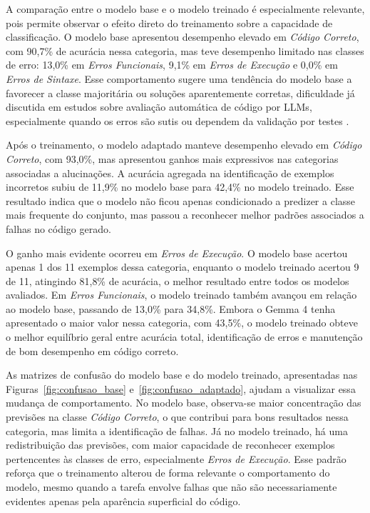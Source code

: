\documentclass[conference]{IEEEtran}
\begin{document}
A comparação entre o modelo base e o modelo treinado é especialmente relevante, pois permite observar o efeito direto do treinamento sobre a capacidade de classificação. O modelo base apresentou desempenho elevado em \emph{Código Correto}, com 90{,}7\% de acurácia nessa categoria, mas teve desempenho limitado nas classes de erro: 13{,}0\% em \emph{Erros Funcionais}, 9{,}1\% em \emph{Erros de Execução} e 0{,}0\% em \emph{Erros de Sintaxe}. Esse comportamento sugere uma tendência do modelo base a favorecer a classe majoritária ou soluções aparentemente corretas, dificuldade já discutida em estudos sobre avaliação automática de código por LLMs, especialmente quando os erros são sutis ou dependem da validação por testes \cite{2507.16587}.

Após o treinamento, o modelo adaptado manteve desempenho elevado em \emph{Código Correto}, com 93{,}0\%, mas apresentou ganhos mais expressivos nas categorias associadas a alucinações. A acurácia agregada na identificação de exemplos incorretos subiu de 11{,}9\% no modelo base para 42{,}4\% no modelo treinado. Esse resultado indica que o modelo não ficou apenas condicionado a predizer a classe mais frequente do conjunto, mas passou a reconhecer melhor padrões associados a falhas no código gerado.

O ganho mais evidente ocorreu em \emph{Erros de Execução}. O modelo base acertou apenas 1 dos 11 exemplos dessa categoria, enquanto o modelo treinado acertou 9 de 11, atingindo 81{,}8\% de acurácia, o melhor resultado entre todos os modelos avaliados. Em \emph{Erros Funcionais}, o modelo treinado também avançou em relação ao modelo base, passando de 13{,}0\% para 34{,}8\%. Embora o Gemma 4 tenha apresentado o maior valor nessa categoria, com 43{,}5\%, o modelo treinado obteve o melhor equilíbrio geral entre acurácia total, identificação de erros e manutenção de bom desempenho em código correto.

As matrizes de confusão do modelo base e do modelo treinado, apresentadas nas Figuras~\ref{fig:confusao_base} e~\ref{fig:confusao_adaptado}, ajudam a visualizar essa mudança de comportamento. No modelo base, observa-se maior concentração das previsões na classe \emph{Código Correto}, o que contribui para bons resultados nessa categoria, mas limita a identificação de falhas. Já no modelo treinado, há uma redistribuição das previsões, com maior capacidade de reconhecer exemplos pertencentes às classes de erro, especialmente \emph{Erros de Execução}. Esse padrão reforça que o treinamento alterou de forma relevante o comportamento do modelo, mesmo quando a tarefa envolve falhas que não são necessariamente evidentes apenas pela aparência superficial do código.
\end{document}
